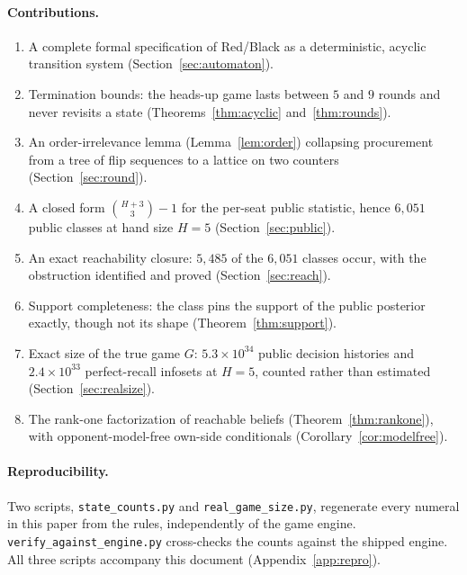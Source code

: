\documentclass[11pt]{article}
\theoremstyle{plain}
\theoremstyle{definition}
\theoremstyle{remark}
\newcommand{\code}[1]{\texttt{\small #1}}
\begin{document}
\paragraph{Contributions.}
\begin{enumerate}\itemsep2pt
  \item A complete formal specification of Red/Black as a deterministic,
        acyclic transition system (Section~\ref{sec:automaton}).
  \item Termination bounds: the heads-up game lasts between $5$ and $9$
        rounds and never revisits a state (Theorems~\ref{thm:acyclic}
        and~\ref{thm:rounds}).
  \item An order-irrelevance lemma (Lemma~\ref{lem:order}) collapsing
        procurement from a tree of flip sequences to a lattice on two
        counters (Section~\ref{sec:round}).
  \item A closed form $\binom{H+3}{3}-1$ for the per-seat public statistic,
        hence $6{,}051$ public classes at hand size $H=5$
        (Section~\ref{sec:public}).
  \item An exact reachability closure: $5{,}485$ of the $6{,}051$ classes
        occur, with the obstruction identified and proved
        (Section~\ref{sec:reach}).
  \item Support completeness: the class pins the support of the public
        posterior exactly, though not its shape (Theorem~\ref{thm:support}).
  \item Exact size of the true game $G$: $5.3\times10^{34}$ public decision
        histories and $2.4\times10^{33}$ perfect-recall infosets at $H=5$,
        counted rather than estimated (Section~\ref{sec:realsize}).
  \item The rank-one factorization of reachable beliefs
        (Theorem~\ref{thm:rankone}), with opponent-model-free own-side
        conditionals (Corollary~\ref{cor:modelfree}).
\end{enumerate}

\paragraph{Reproducibility.}
Two scripts, \code{state\_counts.py} and \code{real\_game\_size.py},
regenerate every numeral in this paper from the rules, independently of
the game engine. \code{verify\_against\_engine.py} cross-checks the
counts against the shipped engine. All three scripts accompany this
document (Appendix~\ref{app:repro}).
\end{document}
